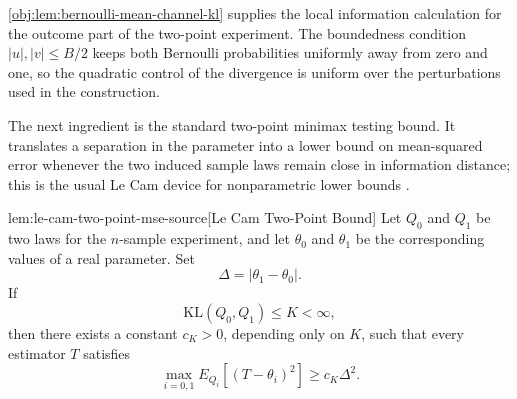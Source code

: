 \documentclass[11pt]{article}
\begin{document}
\cref{obj:lem:bernoulli-mean-channel-kl} supplies the local information calculation for the outcome part of the two-point experiment. The boundedness condition \(|u|,|v|\le B/2\) keeps both Bernoulli probabilities uniformly away from zero and one, so the quadratic control of the divergence is uniform over the perturbations used in the construction.

The next ingredient is the standard two-point minimax testing bound. It translates a separation in the parameter into a lower bound on mean-squared error whenever the two induced sample laws remain close in information distance; this is the usual Le Cam device for nonparametric lower bounds \citep{tsybakov2009}.

\begin{lemmav}{lem:le-cam-two-point-mse-source}[Le Cam Two-Point Bound]
Let \(Q_0\) and \(Q_1\) be two laws for the \(n\)-sample experiment, and let \(\theta_0\) and \(\theta_1\) be the corresponding values of a real parameter. Set
\[
\Delta = |\theta_1-\theta_0|.
\]
If
\[
\mathrm{KL}(Q_0,Q_1)\le K<\infty,
\]
then there exists a constant \(c_K>0\), depending only on \(K\), such that every estimator \(T\) satisfies
\[
\max_{i=0,1} E_{Q_i}\!\left[(T-\theta_i)^2\right]\ge c_K \Delta^2 .
\]
\end{lemmav}
\end{document}
